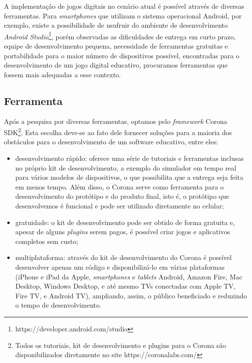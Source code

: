 A implementação de jogos digitais no cenário atual é possível através de diversas ferramentas. Para \textit{smartphones} que utilizam o sistema operacional Android, por exemplo, existe a possibilidade de usufruir do ambiente de desenvolvimento \textit{Android Studio}\footnote{https://developer.android.com/studio}, porém observadas as dificuldades de entrega em curto prazo, equipe de desenvolvimento pequena, necessidade de ferramentas gratuitas e portabilidade para o maior número de dispositivos possível, encontradas para o desenvolvimento de um jogo digital educativo, procuramos ferramentas que fossem mais adequadas a esse contexto.

\subsection{Ferramenta} \label{ssec:ferramenta}

Após a pesquisa por diversas ferramentas, optamos pelo \textit{framework} Corona SDK\footnote{Todos os tutoriais, kit de desenvolvimento e plugins para o Corona são disponibilizados diretamente no site https://coronalabs.com/}. Esta escolha deve-se ao fato dele fornecer soluções para a maioria dos obstáculos para o desenvolvimento de um software educativo, entre eles:

\begin{itemize}
	\item desenvolvimento rápido: oferece uma série de tutoriais e ferramentas inclusas no próprio kit de desenvolvimento, a exemplo do simulador em tempo real para vários modelos de dispositivos, o que possibilita que a entrega seja feita em menos tempo. Além disso, o Corona serve como ferramenta para o desenvolvimento do protótipo e do produto final, isto é, o protótipo que desenvolvemos é funcional e pode ser utilizado diretamente no celular;
	\item gratuidade: o kit de desenvolvimento pode ser obtido de forma gratuita e, apesar de alguns \textit{plugins} serem pagos, é possível criar jogos e aplicativos completos sem custo;
	\item multiplataforma: através do kit de desenvolvimento do Corona é possível desenvolver apenas um código e disponibilizá-lo em várias plataformas (iPhone e iPad da Apple, \textit{smartphones} e \textit{tablets} Android, Amazon Fire, Mac Desktop, Windows Desktop, e até mesmo TVs conectadas com Apple TV, Fire TV, e Android TV), ampliando, assim, o público beneficiado e reduzindo o tempo de desenvolvimento.
\end{itemize}

